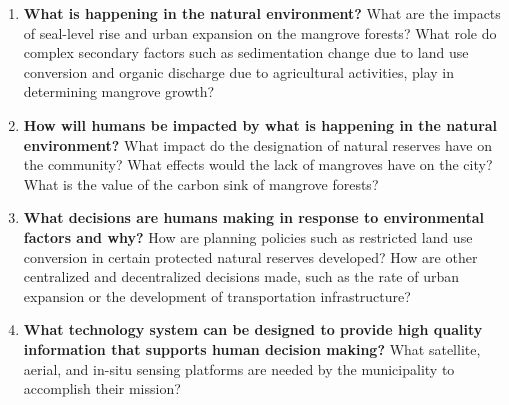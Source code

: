 \begin{enumerate}[itemsep=0pt,parsep=0pt]
	\item \textbf{What is happening in the natural environment?} What are the impacts of seal-level rise and urban expansion on the mangrove forests? What role do complex secondary factors such as sedimentation change due to land use conversion and organic discharge due to agricultural activities, play in determining mangrove growth? 
	\item \textbf{How will humans be impacted by what is happening in the natural environment?} What impact do the designation of natural reserves have on the community? What effects would the lack of mangroves have on the city? What is the value of the carbon sink of mangrove forests?
	\item \textbf{What decisions are humans making in response to environmental factors and why?} How are planning policies such as restricted land use conversion in certain protected natural reserves developed? How are other centralized and decentralized decisions made, such as the rate of urban expansion or the development of transportation infrastructure? 
	\item \textbf{What technology system can be designed to provide high quality information that supports human decision making?} What satellite, aerial, and in-situ sensing platforms are needed by the municipality to accomplish their mission?
\end{enumerate}


%

